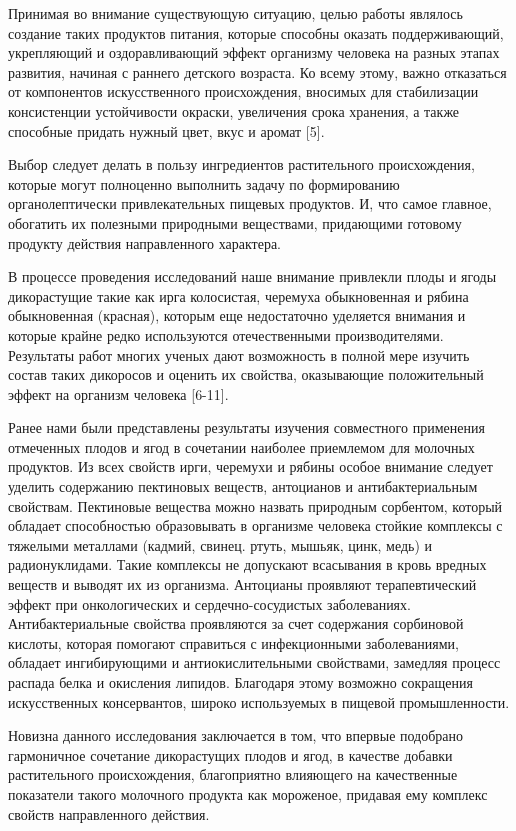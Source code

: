 \begin{multicols}{2}
Принимая во внимание существующую ситуацию, целью работы являлось
создание таких продуктов питания, которые способны оказать
поддерживающий, укрепляющий и оздоравливающий эффект организму человека
на разных этапах развития, начиная с раннего детского возраста. Ко всему
этому, важно отказаться от компонентов искусственного происхождения,
вносимых для стабилизации консистенции устойчивости окраски, увеличения
срока хранения, а также способные придать нужный цвет, вкус и аромат
{[}5{]}.

Выбор следует делать в пользу ингредиентов растительного происхождения,
которые могут полноценно выполнить задачу по формированию
органолептически привлекательных пищевых продуктов. И, что самое
главное, обогатить их полезными природными веществами, придающими
готовому продукту действия направленного характера.

В процессе проведения исследований наше внимание привлекли плоды и ягоды
дикорастущие такие как ирга колосистая, черемуха обыкновенная и рябина
обыкновенная (красная), которым еще недостаточно уделяется внимания и
которые крайне редко используются отечественными производителями.
Результаты работ многих ученых дают возможность в полной мере изучить
состав таких дикоросов и оценить их свойства, оказывающие положительный
эффект на организм человека {[}6-11{]}.

Ранее нами были представлены результаты изучения совместного применения
отмеченных плодов и ягод в сочетании наиболее приемлемом для молочных
продуктов. Из всех свойств ирги, черемухи и рябины особое внимание
следует уделить содержанию пектиновых веществ, антоцианов и
антибактериальным свойствам. Пектиновые вещества можно назвать природным
сорбентом, который обладает способностью образовывать в организме
человека стойкие комплексы с тяжелыми металлами (кадмий, свинец. ртуть,
мышьяк, цинк, медь) и радионуклидами. Такие комплексы не допускают
всасывания в кровь вредных веществ и выводят их из организма. Антоцианы
проявляют терапевтический эффект при онкологических и
сердечно-сосудистых заболеваниях. Антибактериальные свойства проявляются
за счет содержания сорбиновой кислоты, которая помогают справиться с
инфекционными заболеваниями, обладает ингибирующими и антиокислительными
свойствами, замедляя процесс распада белка и окисления липидов.
Благодаря этому возможно сокращения искусственных консервантов, широко
используемых в пищевой промышленности.

Новизна данного исследования заключается в том, что впервые подобрано
гармоничное сочетание дикорастущих плодов и ягод, в качестве добавки
растительного происхождения, благоприятно влияющего на качественные
показатели такого молочного продукта как мороженое, придавая ему
комплекс свойств направленного действия.


\end{multicols}
